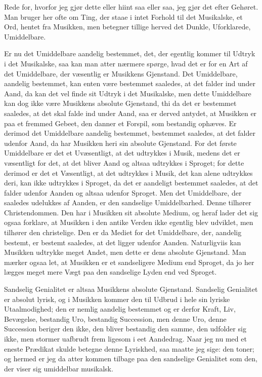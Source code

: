 \documentclass[12pt,a4paper]{article}
\begin{document}
Rede for, hvorfor jeg gjør dette eller hiint saa eller saa, jeg gjør det efter Gehøret. Man bruger her ofte om Ting, der staae i intet Forhold til det Musikalske, et Ord, hentet fra Musikken, men betegner tillige herved det Dunkle, Uforklarede, Umiddelbare.

Er nu det Umiddelbare aandelig bestemmet, det, der egentlig kommer til Udtryk i det Musikalske, saa kan man atter nærmere spørge, hvad det er for en Art af det Umiddelbare, der væsentlig er Musikkens Gjenstand. Det Umiddelbare, aandelig bestemmet, kan enten være bestemmet saaledes, at det falder ind under Aand, da kan det vel finde sit Udtryk i det Musikalske, men dette Umiddelbare kan dog ikke være Musikkens absolute Gjenstand, thi da det er bestemmet saaledes, at det skal falde ind under Aand, saa er derved antydet, at Musikken er paa et fremmed Gebeet, den danner et Forspil, som bestandig ophæves. Er derimod det Umiddelbare aandelig bestemmet, bestemmet saaledes, at det falder udenfor Aand, da har Musikken heri sin absolute Gjenstand. For det første Umiddelbare er det et Uvæsentligt, at det udtrykkes i Musik, medens det er væsentligt for det, at det bliver Aand og altsaa udtrykkes i Sproget; for dette derimod er det et Væsentligt, at det udtrykkes i Musik, det kan alene udtrykkes deri, kan ikke udtrykkes i Sproget, da det er aandeligt bestemmet saaledes, at det falder udenfor Aanden og altsaa udenfor Sproget. Men det Umiddelbare, der saaledes udelukkes af Aanden, er den sandselige Umiddelbarhed. Denne tilhører Christendommen. Den har i Musikken sit absolute Medium, og heraf lader det sig ogsaa forklare, at Musikken i den antike Verden ikke egentlig blev udviklet, men tilhører den christelige. Den er da Mediet for det Umiddelbare, der, aandelig bestemt, er bestemt saaledes, at det ligger udenfor Aanden. Naturligviis kan Musikken udtrykke meget Andet, men dette er dens absolute Gjenstand. Man mærker ogsaa let, at Musikken er et sandseligere Medium end Sproget, da jo her lægges meget mere Vægt paa den sandselige Lyden end ved Sproget.

Sandselig Genialitet er altsaa Musikkens absolute Gjenstand. Sandselig Genialitet er absolut lyrisk, og i Musikken kommer den til Udbrud i hele sin lyriske Utaalmodighed; den er nemlig aandelig bestemmet og er derfor Kraft, Liv, Bevægelse, bestandig Uro, bestandig Succession, men denne Uro, denne Succession beriger den ikke, den bliver bestandig den samme, den udfolder sig ikke, men stormer uafbrudt frem ligesom i eet Aandedrag. Naar jeg nu med et eneste Prædikat skulde betegne denne Lyriskhed, saa maatte jeg sige: den toner; og hermed er jeg da atter kommen tilbage paa den sandselige Genialitet som den, der viser sig umiddelbar musikalsk.
\end{document}
